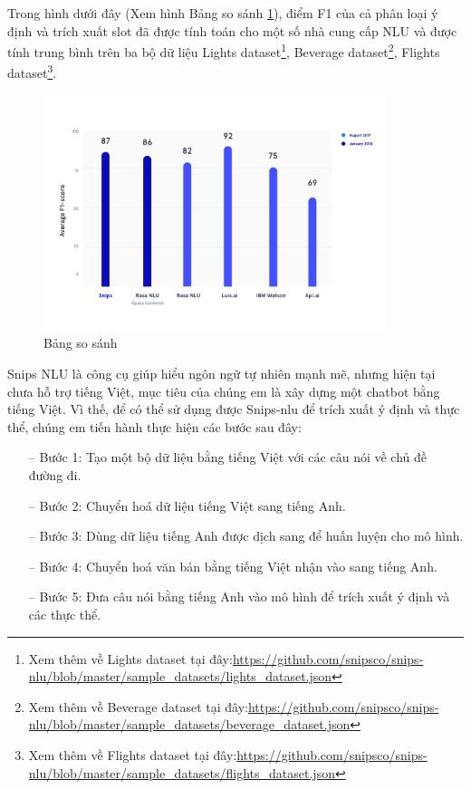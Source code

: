 Trong hình dưới đây (Xem hình Bảng so sánh \ref{fig:benchmarks}), điểm F1 của cả phân loại ý định và trích xuất slot đã được tính toán cho một số nhà cung cấp NLU và được tính trung bình trên ba bộ dữ liệu Lights dataset\footnote{Xem thêm về Lights dataset tại đây:\url{https://github.com/snipsco/snips-nlu/blob/master/sample_datasets/lights_dataset.json}}, Beverage dataset\footnote{Xem thêm về Beverage dataset tại đây:\url{https://github.com/snipsco/snips-nlu/blob/master/sample_datasets/beverage_dataset.json}}, Flights dataset\footnote{Xem thêm về Flights dataset tại đây:\url{https://github.com/snipsco/snips-nlu/blob/master/sample_datasets/flights_dataset.json}}.

\begin{figure}[htp]
    \centering
    \includegraphics[width=10cm]{images/benchmarks.png}
    \caption{Bảng so sánh}
    \label{fig:benchmarks}
\end{figure}

Snips NLU là công cụ giúp hiểu ngôn ngữ tự nhiên mạnh mẽ, nhưng hiện tại chưa hỗ trợ tiếng Việt, mục tiêu của chúng em là xây dựng một chatbot bằng tiếng Việt. Vì thế, để có thể sử dụng được Snips-nlu để trích xuất ý định và thực thể, chúng em tiến hành thực hiện các bước sau đây:
\begin{itemize}
    \item[--] Bước 1: Tạo một bộ dữ liệu bằng tiếng Việt với các câu nói về chủ đề đường đi.
    \item[--] Bước 2: Chuyển hoá dữ liệu tiếng Việt sang tiếng Anh.
    \item[--] Bước 3: Dùng dữ liệu tiếng Anh được dịch sang để huấn luyện cho mô hình.
    \item[--] Bước 4: Chuyển hoá văn bản bằng tiếng Việt nhận vào sang tiếng Anh.
    \item[--] Bước 5: Đưa câu nói bằng tiếng Anh vào mô hình để trích xuất ý định và các thực thể.
\end{itemize}

